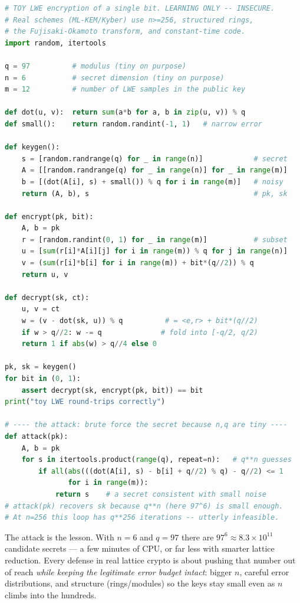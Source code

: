 \begin{implementbox}
\begin{lstlisting}[language=Python]
# TOY LWE encryption of a single bit. LEARNING ONLY -- INSECURE.
# Real schemes (ML-KEM/Kyber) use n>=256, structured rings,
# the Fujisaki-Okamoto transform, and constant-time code.
import random, itertools

q = 97          # modulus (tiny on purpose)
n = 6           # secret dimension (tiny on purpose)
m = 12          # number of LWE samples in the public key

def dot(u, v):  return sum(a*b for a, b in zip(u, v)) % q
def small():    return random.randint(-1, 1)   # narrow error

def keygen():
    s = [random.randrange(q) for _ in range(n)]            # secret
    A = [[random.randrange(q) for _ in range(n)] for _ in range(m)]
    b = [(dot(A[i], s) + small()) % q for i in range(m)]   # noisy
    return (A, b), s                                       # pk, sk

def encrypt(pk, bit):
    A, b = pk
    r = [random.randint(0, 1) for _ in range(m)]           # subset
    u = [sum(r[i]*A[i][j] for i in range(m)) % q for j in range(n)]
    v = (sum(r[i]*b[i] for i in range(m)) + bit*(q//2)) % q
    return u, v

def decrypt(sk, ct):
    u, v = ct
    w = (v - dot(sk, u)) % q          # = <e,r> + bit*(q//2)
    if w > q//2: w -= q              # fold into [-q/2, q/2)
    return 1 if abs(w) > q//4 else 0

pk, sk = keygen()
for bit in (0, 1):
    assert decrypt(sk, encrypt(pk, bit)) == bit
print("toy LWE round-trips correctly")

# ---- the attack: brute force the secret because n,q are tiny ----
def attack(pk):
    A, b = pk
    for s in itertools.product(range(q), repeat=n):   # q**n guesses
        if all(abs(((dot(A[i], s) - b[i] + q//2) % q) - q//2) <= 1
               for i in range(m)):
            return s    # a secret consistent with small noise
# attack(pk) recovers sk because q**n (here 97^6) is small enough.
# At n=256 this loop has q**256 iterations -- utterly infeasible.
\end{lstlisting}
\end{implementbox}

The attack is the lesson. With $n=6$ and $q=97$ there are $97^6 \approx 8.3\times 10^{11}$ candidate secrets --- a few minutes of CPU, or far less with smarter lattice reduction. Every defense in real lattice crypto is about pushing that number out of reach \emph{while keeping the legitimate error budget intact}: bigger $n$, careful error distributions, and structure (rings/modules) so the keys stay small even as $n$ climbs into the hundreds.

